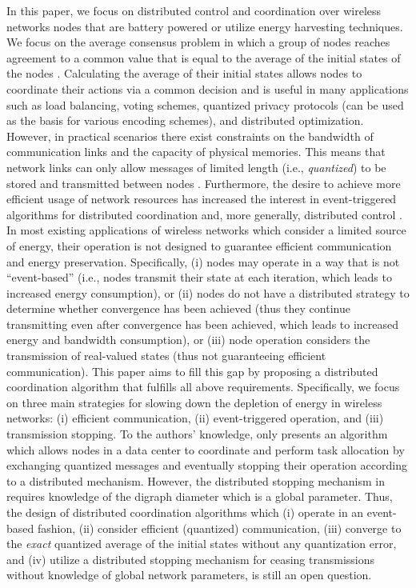 \documentclass[twocolumn]{autart}    %
\begin{document}
In this paper, we focus on distributed control and coordination over wireless networks nodes that are battery powered or utilize energy harvesting techniques. 
We focus on the average consensus problem in which a group of nodes reaches agreement to a common value that is equal to the average of the initial states of the nodes \cite{2018:BOOK_Hadj, 2013:Themis_Hadj_Johansson}. 
Calculating the average of their initial states allows nodes to coordinate their actions via a common decision and is useful in many applications such as load balancing, voting schemes, quantized privacy protocols (can be used as the basis for various encoding schemes), and distributed optimization. 
However, in practical scenarios there exist constraints on the bandwidth of communication links and the capacity of physical memories. 
This means that network links can only allow messages of limited length (i.e., \textit{quantized}) to be stored and transmitted between nodes \cite{2016:Chamie_Basar, 2011:Cai_Ishii, 2020:Rikos_Quant_Cons, 2021:Rikos_Hadj_Splitting}. 
Furthermore, the desire to achieve more efficient usage of network resources has increased the interest in event-triggered algorithms for distributed coordination and, more generally, distributed control \cite{2013:Dimarogonas_Johansson, 2016:nowzari_cortes, 2018:Manitara_Hadj}. 
In most existing applications of wireless networks which consider a limited source of energy, their operation is not designed to guarantee efficient communication and energy preservation. 
Specifically, (i) nodes may operate in a way that is not ``event-based'' (i.e., nodes transmit their state at each iteration, which leads to increased energy consumption), or (ii) nodes do not have a distributed strategy to determine whether convergence has been achieved (thus they continue transmitting even after convergence has been achieved, which leads to increased energy and bandwidth consumption), or (iii) node operation considers the transmission of real-valued states (thus not guaranteeing efficient communication). 
This paper aims to fill this gap by proposing a distributed coordination algorithm that fulfills all above requirements. 
Specifically, we focus on three main strategies for slowing down the depletion of energy in wireless networks: (i) efficient communication, (ii) event-triggered operation, and (iii) transmission stopping. 
To the authors' knowledge, only \cite{2021:Rikos_TaskScheduling} presents an algorithm which allows nodes in a data center to coordinate and perform task allocation by exchanging quantized messages and eventually stopping their operation according to a distributed mechanism. 
However, the distributed stopping mechanism in \cite{2021:Rikos_TaskScheduling} requires knowledge of the digraph diameter which is a global parameter. 
Thus, the design of distributed coordination algorithms which (i) operate in an event-based fashion, (ii) consider efficient (quantized) communication, (iii) converge to the \textit{exact} quantized average of the initial states without any quantization error, and (iv) utilize a distributed stopping mechanism for ceasing transmissions without knowledge of global network parameters, is still an open question. 
\end{document}
